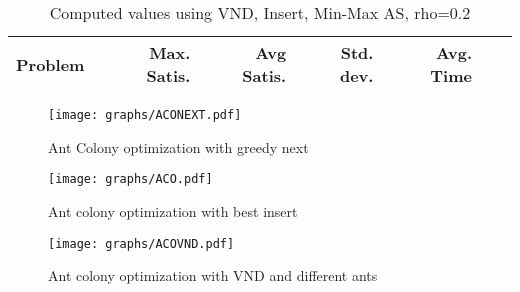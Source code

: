 \documentclass{article}
\begin{document}
\begin{table}
  \vspace{-6mm}%
  \caption{Computed values using VND, Insert, Min-Max AS, rho=0.2}
  \label{tab:conf15}
  \setlength{\tabcolsep}{1.4mm}
  \centering
  \begin{tabular}{lrrrrrr}
    \bfseries Problem & 
    \bfseries Max. Satis. &
    \bfseries Avg Satis. &
    \bfseries Std. dev. &
    \bfseries Avg. Time 
    \\\hline
    
    \hline
  \end{tabular}

\end{table}


\clearpage





\begin{figure}
\centering
\texttt{[image: graphs/ACONEXT.pdf]}
\caption{Ant Colony optimization with greedy next}
\label{fig:ACONEXT}
\end{figure}

\begin{figure}
\centering
\texttt{[image: graphs/ACO.pdf]}
\caption{Ant colony optimization with best insert}
\label{fig:ACO}
\end{figure}

\begin{figure}
\centering
\texttt{[image: graphs/ACOVND.pdf]}
\caption{Ant colony optimization with VND and different ants}
\label{fig:vnd}
\end{figure}
\end{document}
